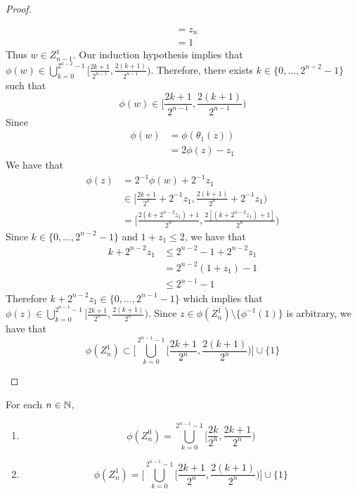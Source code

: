 \documentclass{book}
\begin{document}
\begin{proof}
\begin{enumerate}
\begin{align*}
				& = z_n \\
				& = 1
			\end{align*} 
			Thus $w \in Z_{n-1}^1$. Our induction hypothesis implies that $\phi(w) \in \bigcup\limits_{k =0}^{2^{n-2} -1} \bigg[ \frac{2k+1}{2^{n-1}}, \frac{2(k+1)}{2^{n-1}} \bigg)$. Therefore, there exists $k \in \{0, \ldots, 2^{n-2} -1\}$ such that $$\phi(w) \in \bigg[ \frac{2k+1}{2^{n-1}}, \frac{2(k+1)}{2^{n-1}} \bigg)$$ Since 
			\begin{align*}
				\phi(w) 
				& = \phi(\theta_1(z)) \\
				& = 2 \phi(z) - z_1
			\end{align*}
			We have that
			\begin{align*}
				\phi(z) 
				& = 2^{-1}\phi(w) + 2^{-1} z_1 \\
				& \in \bigg[ \frac{2k+1}{2^n} + 2^{-1}z_1, \frac{2(k + 1)}{2^n} +  2^{-1}z_1 \bigg) \\
				& = \bigg[ \frac{2(k+ 2^{n-2}z_1) + 1}{2^n}, \frac{2[(k+ 2^{n-2}z_1) + 1]}{2^n} \bigg) 
			\end{align*}
			Since $k \in \{0, \ldots, 2^{n-2} -1\}$ and $1 + z_1 \leq 2$, we have that 
			\begin{align*}
				k+ 2^{n-2}z_1 
				& \leq 2^{n-2} -1 + 2^{n-2}z_1  \\
				&  =  2^{n-2}(1 + z_1) - 1 \\
				& \leq 2^{n-1} - 1
			\end{align*} 
			Therefore $	k+ 2^{n-2}z_1 \in \{0, \ldots, 2^{n-1} - 1\}$ which implies that $\phi(z) \in  \bigcup\limits_{k =0}^{2^{n-1} -1} \bigg[ \frac{2k+1}{2^n}, \frac{2(k+1)}{2^n} \bigg)$. Since $z \in \phi(Z_n^1) \setminus \{\phi^{-1}(1)\}$ is arbitrary, we have that
			$$\phi(Z_n^1 ) \subset \bigg[ \bigcup\limits_{k =0}^{2^{n-1} -1} \bigg[ \frac{2k + 1}{2^n}, \frac{2(k+1)}{2^n} \bigg) \bigg] \cup \{1\}$$
		\end{enumerate}
	\end{proof}
	
	
	
	\begin{ex} 
		For each $n \in \mathbb{N}$, 
		\begin{enumerate}
			\item $$\phi(Z_n^0) = \bigcup_{k =0}^{2^{n-1} -1} \bigg[ \frac{2k}{2^n}, \frac{2k+1}{2^n} \bigg)$$
			\item $$\phi(Z_n^1) = \bigg[ \bigcup\limits_{k =0}^{2^{n-1} -1} \bigg[ \frac{2k + 1}{2^n}, \frac{2(k+1)}{2^n} \bigg) \bigg] \cup \{1\}$$
		\end{enumerate}
	\end{ex}
	
\end{document}

